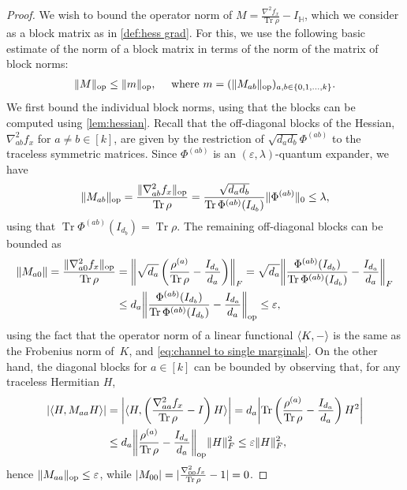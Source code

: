\documentclass[aos]{imsart}
\theoremstyle{definition}
\numberwithin{equation}{section}
\DeclareMathOperator{\op}{op}
\DeclareMathOperator{\tr}{Tr}
\DeclarePairedDelimiter{\abs}{\lvert}{\rvert}
\DeclarePairedDelimiter{\norm}{\lVert}{\rVert}
\renewcommand{\H}{{\mathbb{H}}}
\newcommand{\eps}{\varepsilon}
\newcommand{\samp}{x}
\begin{document}
\begin{proof}
We wish to bound the operator norm of $M = \frac{\nabla^2 f_\samp}{\tr \rho} - I_\H$, which we consider as a block matrix as in \cref{def:hess grad}.
For this, we use the following basic estimate of the norm of a block matrix in terms of the norm of the matrix of block norms:
\begin{align}\label{eq:baby norm bounds}
  \norm{M}_{\op} \leq \norm{m}_{\op},
\quad \text{ where } m=(\norm{M_{ab}}_{\op})_{a,b\in\{0,1,\dots,k\}}.
\end{align}
We first bound the individual block norms, using that the blocks can be computed using \cref{lem:hessian}.
Recall that the off-diagonal blocks of the Hessian, $\nabla^2_{ab} f_x$ for $a \neq b\in[k]$, are given by the restriction of $\sqrt{d_a d_b} \Phi^{(ab)}$ to the traceless symmetric matrices.
Since $\Phi^{(ab)}$ is an $(\eps,\lambda)$-quantum expander, we have
\begin{align*}
  \norm{M_{ab}}_{\op}
= \frac{\norm{\nabla^2_{ab} f_x}_{\op}}{\tr\rho}
= \frac{\sqrt{d_a d_b}}{\tr \Phi^{(ab)}(I_{d_b})} \norm{\Phi^{(ab)}}_0
\leq \lambda,
\end{align*}
using that $\tr \Phi^{(ab)}(I_{d_b}) = \tr \rho$.
The remaining off-diagonal blocks can be bounded as
\begin{align*}
\norm{M_{a0}}
= \frac{\norm{\nabla^2_{a0} f_x}_{\op}}{\tr \rho}
&= \norm*{\sqrt{d_a} \left( \frac{\rho^{(a)}}{\tr \rho} - \frac{I_{d_a}}{d_a} \right)}_F
= \sqrt{d_a} \norm*{\frac{\Phi^{(ab)}(I_{d_b})}{\tr \Phi^{(ab)}(I_{d_b})} - \frac{I_{d_a}}{d_a}}_F \\
&\leq d_a \norm*{\frac{\Phi^{(ab)}(I_{d_b})}{\tr \Phi^{(ab)}(I_{d_b})} - \frac{I_{d_a}}{d_a}}_{\op}
\leq \eps,
\end{align*}
using the fact that the operator norm of a linear functional $\braket{K, -}$ is the same as the Frobenius norm of~$K$, and \cref{eq:channel to single marginals}.
On the other hand, the diagonal blocks for $a\in[k]$ can be bounded by observing that, for any traceless Hermitian $H$,
\begin{align*}
  \abs{\braket{H, M_{aa} H}}
&= \abs*{\braket{H, \left( \frac{\nabla^2_{aa} f_x}{\tr \rho} - I \right) H}}
= d_a \abs*{\tr \left( \frac{\rho^{(a)}}{\tr \rho} - \frac{I_{d_a}}{d_a} \right) H^2} \\
&\leq d_a \norm*{\frac{\rho^{(a)}}{\tr \rho} - \frac{I_{d_a}}{d_a}}_{\op} \norm{H}_F^2
\leq \eps \norm H_F^2,
\end{align*}
hence $\norm{M_{aa}}_{\op} \leq \eps$, while $\abs{M_{00}} = \abs{\frac{\nabla^2_{00} f_x}{\tr \rho} - 1} = 0$.

\end{proof}
\end{document}
